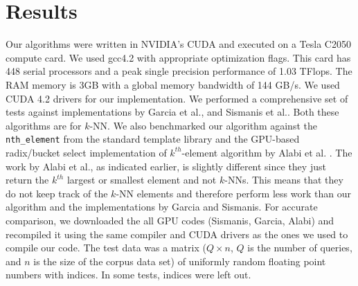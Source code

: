 \documentclass[10pt]{article}
\begin{document}
\section*{Results}
Our algorithms were written in NVIDIA's CUDA \cite{Sanders:2010} and executed on a Tesla C2050 compute card. We used gcc4.2 with appropriate optimization flags. This card has 448 serial processors and a peak single precision performance of 1.03 TFlops.  The RAM memory is 3GB with a global memory bandwidth of 144 GB/s. We used CUDA 4.2 drivers for our implementation. We performed a comprehensive set of tests against implementations by Garcia et al.\cite{Garcia2010}, and Sismanis et al.\cite{Sismanis:2012}. Both these algorithms are for $k$-NN. We also benchmarked our algorithm against the  \texttt{nth\_element} from the standard template library and the GPU-based radix/bucket select implementation of $k^{th}$-element algorithm by Alabi et al.  \cite{Alabi:2012}. The work by Alabi et al., as indicated earlier, is slightly different since they just return the $k^{th}$ largest or smallest element and not $k$-NNs. This means that they do not keep track of the $k$-NN elements and therefore perform less work than our algorithm and the implementations by Garcia and Sismanis.  For accurate comparison, we downloaded the all GPU codes (Sismanis, Garcia, Alabi) and recompiled it using the same compiler and CUDA drivers as the ones we used to compile our code. The test data was a matrix ($Q \times n$, $Q$ is the number of queries, and $n$ is the size of the corpus data set) of uniformly random floating point numbers with indices. In some tests, indices were left out.\\
\end{document}

